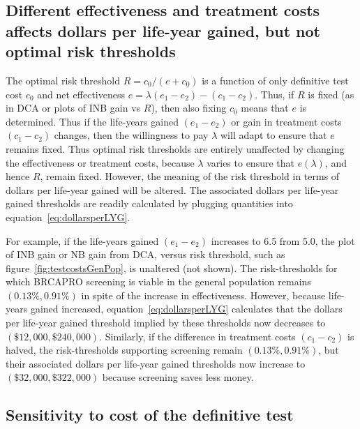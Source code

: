 \documentclass[AMA,STIX1COL]{WileyNJD-v2}
\begin{document}
\subsection{Different effectiveness and treatment costs affects dollars per life-year gained, but not optimal risk thresholds}
\label{sec:40vs50}

The optimal risk threshold $R=c_0/(e+c_0)$ is a function of only definitive test cost $c_0$ and net effectiveness $e=\lambda(e_1-e_2)-(c_1-c_2)$.   Thus, if $R$ is fixed (as in DCA or plots of INB gain vs $R$), then also fixing $c_0$ means that $e$ is determined.  Thus if the life-years gained $(e_1-e_2)$ or gain in treatment costs $(c_1-c_2)$ changes, then the willingness to pay $\lambda$ will adapt to ensure that $e$ remains fixed.  Thus optimal risk thresholds are entirely unaffected by changing the effectiveness or treatment costs, because $\lambda$ varies to ensure that $e(\lambda)$, and hence $R$, remain fixed.  However, the meaning of the risk threshold in terms of dollars per life-year gained will be altered.  The associated dollars per life-year gained thresholds are readily calculated by plugging quantities into equation~\ref{eq:dollarsperLYG}.

For example, if the life-years gained $(e_1-e_2)$ increases to 6.5 from 5.0, the plot of INB gain or NB gain from DCA, versus risk threshold, such as figure~\ref{fig:testcostsGenPop}, is unaltered (not shown).  The risk-thresholds for which BRCAPRO screening is viable in the general population remains $(0.13\%,0.91\%)$ in spite of the increase in effectiveness.   However, because life-years gained increased, equation~\ref{eq:dollarsperLYG} calculates that the dollars per life-year gained threshold implied by these thresholds now decreases to $(\$12,\!000,\$240,\!000)$.   Similarly, if the difference in treatment costs $(c_1-c_2)$ is halved, the risk-thresholds supporting screening remain $(0.13\%,0.91\%)$, but their associated dollars per life-year gained thresholds now increase to $(\$32,\!000,\$322,\!000)$ because screening saves less money.



\subsection{Sensitivity to cost of the definitive test}
\label{sec:SensitivityC0}
\end{document}

